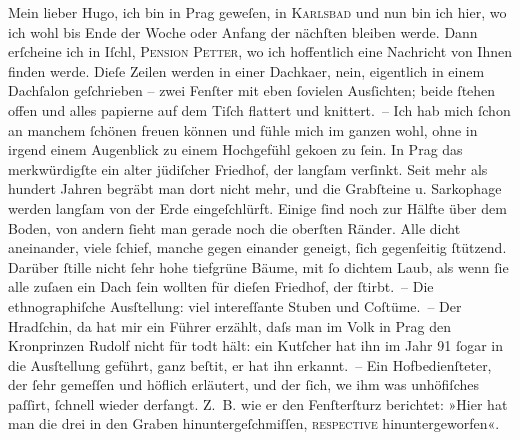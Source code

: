 \pstart{}Mein lieber Hugo,\pend\vspace{0.5em}
\pstart
           ich bin in Prag geweſen, in \textsc{Karlsbad} und nun bin ich hier, wo ich wohl bis Ende der Woche oder Anfang der nächſten
               bleiben werde. Dann erſcheine ich in Iſchl, \textsc{Pension Petter}, wo ich hoffentlich eine Nachricht von Ihnen finden werde. Dieſe Zeilen werden
               in einer Dachka{\geminationm}er, nein, eigentlich in einem Dachſalon
               geſchrieben – zwei Fenſter mit eben{ }ſovielen Ausſichten; beide{ }ſtehen offen und alles
               papierne {\pb}auf dem Tiſch flattert und knittert. – Ich hab
               mich{ }ſchon an manchem{ }ſchönen freuen können und fühle mich im ganzen wohl, ohne in
               irgend einem Augenblick zu einem Hochgefühl geko{\geminationm}en zu{ }ſein. In Prag das merkwürdigſte ein alter jüdiſcher Friedhof, der
               langſam verſinkt. Seit mehr als hundert Jahren begräbt man dort nicht mehr, und die
               Grabſteine u. Sarkophage werden langſam von der Erde eingeſchlürft. Einige{ }ſind noch
               zur Hälfte über dem Boden, von andern{ }ſieht man gerade noch die oberſten Ränder. Alle
               dicht aneinander, viele{ }ſchief, manche gegen einander geneigt,{ }ſich gegenſeitig {\pb}ſtützend. Darüber{ }ſtille nicht{ }ſehr hohe tiefgrüne Bäume,
               mit{ }ſo dichtem Laub, als wenn{ }ſie alle zuſa{\geminationm}en ein Dach{ }ſein wollten für dieſen Friedhof, der{ }ſtirbt. – Die ethnographiſche
                  Ausſtellung: viel intereſſante Stuben und Coſtüme. – Der Hradſchin, da hat mir ein Führer erzählt, daſs man im Volk in
                  Prag den Kronprinzen Rudolf nicht für todt hält: ein Kutſcher hat ihn im Jahr
                  91{ }ſogar in die Ausſtellung geführt, ganz beſti{\geminationm}t, er hat ihn erkannt. – Ein Hofbedienſteter, der{ }ſehr
               gemeſſen und höflich erläutert, und der{ }ſich, we{\geminationn} ihm
               was unhöfiſches paſſirt,{ }ſchnell wieder derfangt. Z. B. {\pb}wie er den Fenſterſturz berichtet: »Hier hat man die drei in den Graben
               hinuntergeſchmiſſen, \textsc{reſpective} hinuntergeworfen«.\pend
           
